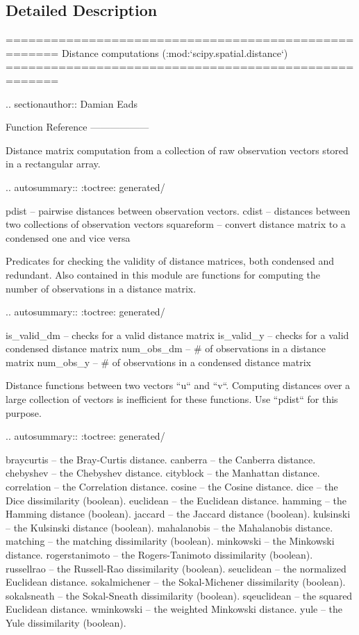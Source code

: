 \subsection{Detailed Description}
\begin{DoxyVerb}=====================================================
Distance computations (:mod:`scipy.spatial.distance`)
=====================================================

.. sectionauthor:: Damian Eads

Function Reference
------------------

Distance matrix computation from a collection of raw observation vectors
stored in a rectangular array.

.. autosummary::
   :toctree: generated/

   pdist   -- pairwise distances between observation vectors.
   cdist   -- distances between two collections of observation vectors
   squareform -- convert distance matrix to a condensed one and vice versa

Predicates for checking the validity of distance matrices, both
condensed and redundant. Also contained in this module are functions
for computing the number of observations in a distance matrix.

.. autosummary::
   :toctree: generated/

   is_valid_dm -- checks for a valid distance matrix
   is_valid_y  -- checks for a valid condensed distance matrix
   num_obs_dm  -- # of observations in a distance matrix
   num_obs_y   -- # of observations in a condensed distance matrix

Distance functions between two vectors ``u`` and ``v``. Computing
distances over a large collection of vectors is inefficient for these
functions. Use ``pdist`` for this purpose.

.. autosummary::
   :toctree: generated/

   braycurtis       -- the Bray-Curtis distance.
   canberra         -- the Canberra distance.
   chebyshev        -- the Chebyshev distance.
   cityblock        -- the Manhattan distance.
   correlation      -- the Correlation distance.
   cosine           -- the Cosine distance.
   dice             -- the Dice dissimilarity (boolean).
   euclidean        -- the Euclidean distance.
   hamming          -- the Hamming distance (boolean).
   jaccard          -- the Jaccard distance (boolean).
   kulsinski        -- the Kulsinski distance (boolean).
   mahalanobis      -- the Mahalanobis distance.
   matching         -- the matching dissimilarity (boolean).
   minkowski        -- the Minkowski distance.
   rogerstanimoto   -- the Rogers-Tanimoto dissimilarity (boolean).
   russellrao       -- the Russell-Rao dissimilarity (boolean).
   seuclidean       -- the normalized Euclidean distance.
   sokalmichener    -- the Sokal-Michener dissimilarity (boolean).
   sokalsneath      -- the Sokal-Sneath dissimilarity (boolean).
   sqeuclidean      -- the squared Euclidean distance.
   wminkowski       -- the weighted Minkowski distance.
   yule             -- the Yule dissimilarity (boolean).\end{DoxyVerb}
 

